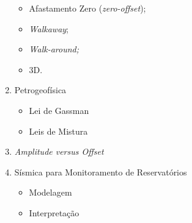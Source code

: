 \documentclass[a4paper,11pt]{scrartcl}
\begin{document}
\begin{enumerate}
\begin{itemize}
	\item Afastamento Zero (\emph{zero-offset});
	\item \emph{Walkaway};
	\item \emph{Walk-around;}
	\item 3D.
	\end{itemize}
\item Petrogeof\'isica
	\begin{itemize}
	\item Lei de Gassman
	\item Leis de Mistura
	\end{itemize}	
\item \emph{Amplitude versus Offset}
\item S\'ismica para Monitoramento de Reservat\'orios
	\begin{itemize}
	\item Modelagem
	\item Interpreta\c{c}\~ao
	\end{itemize}
\end{enumerate}
\end{document}
